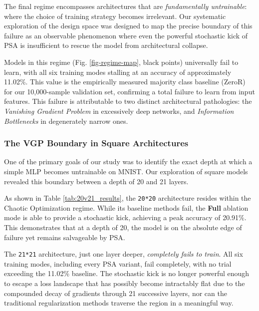 \documentclass[conference]{IEEEtran}
\begin{document}
The final regime encompasses architectures that are \textit{fundamentally untrainable}: where the choice of training strategy becomes irrelevant. Our systematic exploration of the design space was designed to map the precise boundary of this failure as an observable phenomenon where even the powerful stochastic kick of PSA is insufficient to rescue the model from architectural collapse.

Models in this regime (Fig. \ref{fig-regime-map}, black points) universally fail to learn, with all six training modes stalling at an accuracy of approximately 11.02\%. This value is the empirically measured majority class baseline (ZeroR) for our 10,000-sample validation set, confirming a total failure to learn from input features. This failure is attributable to two distinct architectural pathologies: the \textit{Vanishing Gradient Problem} in excessively deep networks, and \textit{Information Bottlenecks} in degenerately narrow ones.

\subsubsection{The VGP Boundary in Square Architectures}

One of the primary goals of our study was to identify the exact depth at which a simple MLP becomes untrainable on MNIST. Our exploration of square models revealed this boundary between a depth of 20 and 21 layers.

As shown in Table \ref{tab:20v21_results}, the \texttt{20*20} architecture resides within the Chaotic Optimization regime. While its baseline methods fail, the \textbf{Full} ablation mode is able to provide a stochastic kick, achieving a peak accuracy of 20.91\%. This demonstrates that at a depth of 20, the model is on the absolute edge of failure yet remains salvageable by PSA.

The \texttt{21*21} architecture, just one layer deeper, \textit{completely fails to train}. All six training modes, including every PSA variant, fail completely, with no trial exceeding the 11.02\% baseline. The stochastic kick is no longer powerful enough to escape a loss landscape that has possibly become intractably flat due to the compounded decay of gradients through 21 successive layers, nor can the traditional regularization methods traverse the region in a meaningful way.
\end{document}
